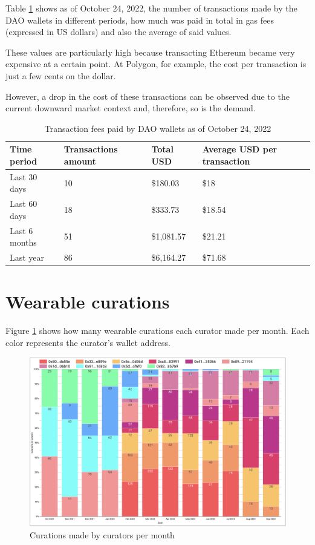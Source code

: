 \documentclass[MSE,Master,english]{twbook}%
\begin{document}
Table \ref{table:fees} shows as of October 24, 2022, the number of transactions made by the DAO wallets in different periods, how much was paid in total in gas fees (expressed in US dollars) and also the average of said values. 

These values are particularly high because transacting Ethereum became very expensive at a certain point. At Polygon, for example, the cost per transaction is just a few cents on the dollar.

However, a drop in the cost of these transactions can be observed due to the current downward market context and, therefore, so is the demand.
\begin{center}
  \begin{table}[H]
    \begin{tabular}{ | m{8em} | m{10em} | m{6em} | m{15em} | }
      \hline
      \textbf{Time period} & \textbf{Transactions amount} & \textbf{Total USD} & \textbf{Average USD per transaction} \\ 
      \hline
      Last 30 days &	10 &	\$180.03 &	\$18 \\
      \hline
      Last 60 days &	18 &	\$333.73 &	\$18.54 \\
      \hline
      Last 6 months &	51 &	\$1,081.57 &	\$21.21 \\
      \hline
      Last year &	86 &	\$6,164.27 &	\$71.68 \\
      \hline
    \end{tabular}
    \caption{Transaction fees paid by DAO wallets as of October 24, 2022}
    \label{table:fees}
  \end{table}
\end{center}

\section{Wearable curations}

Figure \ref{fig:curations} shows how many wearable curations each curator made per month. Each color represents the curator's wallet address.
\begin{figure}[H]
  \centering
  \includegraphics[width=\textwidth]{metrics/curations.png}
  \caption{Curations made by curators per month}
  \label{fig:curations}
\end{figure}
\end{document}
